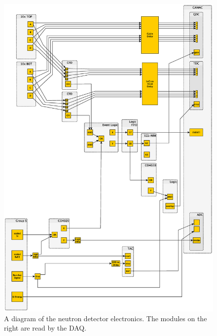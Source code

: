 \begin{figure}[htp]
\centering
\includegraphics[width=1.0\textwidth]{figures/electronics.eps}
\caption{A diagram of the neutron detector electronics.  The modules on the right are read by the DAQ.}
\label{fig:fullElectronics}
\end{figure}

